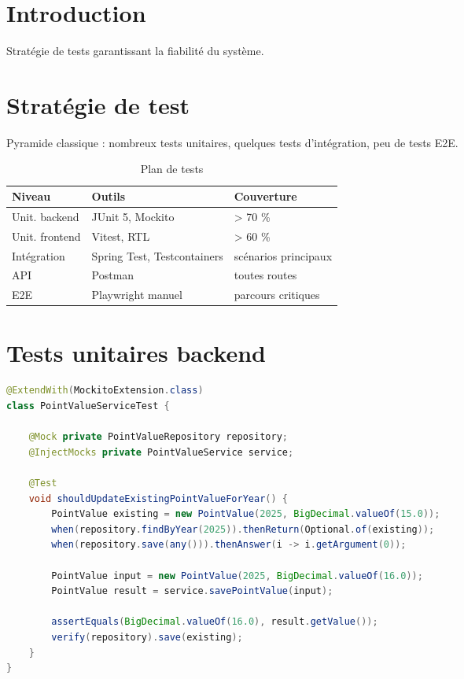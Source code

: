 \documentclass[12pt,a4paper,oneside]{report}
\begin{document}
\section{Introduction}
Stratégie de tests garantissant la fiabilité du système.

\section{Stratégie de test}
Pyramide classique : nombreux tests unitaires, quelques tests d'intégration, peu de tests E2E.

\begin{table}[H]
\centering
\caption{Plan de tests}
\begin{tabular}{lll}
\toprule
\textbf{Niveau} & \textbf{Outils} & \textbf{Couverture} \\
\midrule
Unit. backend & JUnit 5, Mockito & \textgreater{} 70 \% \\
Unit. frontend & Vitest, RTL & \textgreater{} 60 \% \\
Intégration & Spring Test, Testcontainers & scénarios principaux \\
API & Postman & toutes routes \\
E2E & Playwright manuel & parcours critiques \\
\bottomrule
\end{tabular}
\end{table}

\section{Tests unitaires backend}

\begin{lstlisting}[language=Java,caption={Exemple de test unitaire}]
@ExtendWith(MockitoExtension.class)
class PointValueServiceTest {

    @Mock private PointValueRepository repository;
    @InjectMocks private PointValueService service;

    @Test
    void shouldUpdateExistingPointValueForYear() {
        PointValue existing = new PointValue(2025, BigDecimal.valueOf(15.0));
        when(repository.findByYear(2025)).thenReturn(Optional.of(existing));
        when(repository.save(any())).thenAnswer(i -> i.getArgument(0));

        PointValue input = new PointValue(2025, BigDecimal.valueOf(16.0));
        PointValue result = service.savePointValue(input);

        assertEquals(BigDecimal.valueOf(16.0), result.getValue());
        verify(repository).save(existing);
    }
}
\end{lstlisting}
\end{document}
